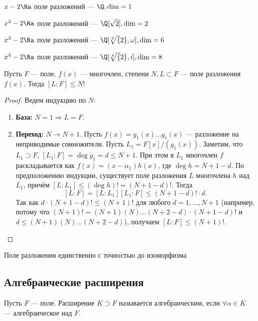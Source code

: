 \begin{example}
    \(x - 2 \Ra\) поле разложений --- \(\Q, \dim = 1\)
\end{example}

\begin{example}
    \(x^2 - 2 \Ra\) поле разложений --- \(\Q[\sqrt{2}], \dim = 2\)
\end{example}

\begin{example}
    \(x^3 - 2 \Ra\) поле разложений --- \(\Q[\sqrt[3]{2}, \omega], \dim = 6\)
\end{example}

\begin{example}
    \(x^4 - 2 \Ra\) поле разложений --- \(\Q[\sqrt[4]{2}, i], \dim = 8\)
\end{example}

\begin{proposition}
    Пусть \(F\) --- поле, \(f(x)\) --- многочлен, степени \(N, L \subset F\) --- поле разложения \(f(x)\). Тогда \([L:F] \le N!\)
\end{proposition}
\begin{proof}
    Ведем индукцию по \(N\):
    \begin{enumerate}
        \item[] \textbf{База:} \(N = 1 \Rightarrow L = F\).
        \item[] \textbf{Переход:} \(N \rightarrow N+1\). Пусть \(f(x) = g_1(x) \dots g_s(x)\) — разложение на неприводимые сомножители. Пусть \(L_1 = F[x]/(g_1(x))\). Заметим, что \(L_1 \supset F\), \([L_1:F] = \deg g_1 = d \le N+1\). При этом в \(L_1\) многочлен \(f\) раскладывается как \(f(x) = (x - \alpha_1)h(x)\), где \(\deg h = N+1-d\). По предположению индукции, существует поле разложения \(L\) многочлена \(h\) над \(L_1\), причём \([L:L_1] \le (\deg h)! = (N+1-d)!\). Тогда
        \[
        [L:F] = [L:L_1][L_1:F] \le (N+1-d)! \cdot d.
        \]
        Так как \(d \cdot (N+1-d)! \le (N+1)!\) для любого \(d = 1,\dots,N+1\) (например, потому что \((N+1)! = (N+1)(N)\dots(N+2-d) \cdot (N+1-d)!\) и \(d \le (N+1)(N)\dots(N+2-d)\)), получаем \([L:F] \le (N+1)!\).
    \end{enumerate}
\end{proof}

\begin{proposition}[б/д]
    Поле разложения единственно с точностью до изоморфизма
\end{proposition}

\subsection{Алгебраические расширения}
\begin{definition}
    Пусть \(F\) --- поле. Расширение \(K \supset F\) называется алгебраическим, если \(\forall \alpha \in K\) --- алгебраическое над \(F\).
\end{definition}

